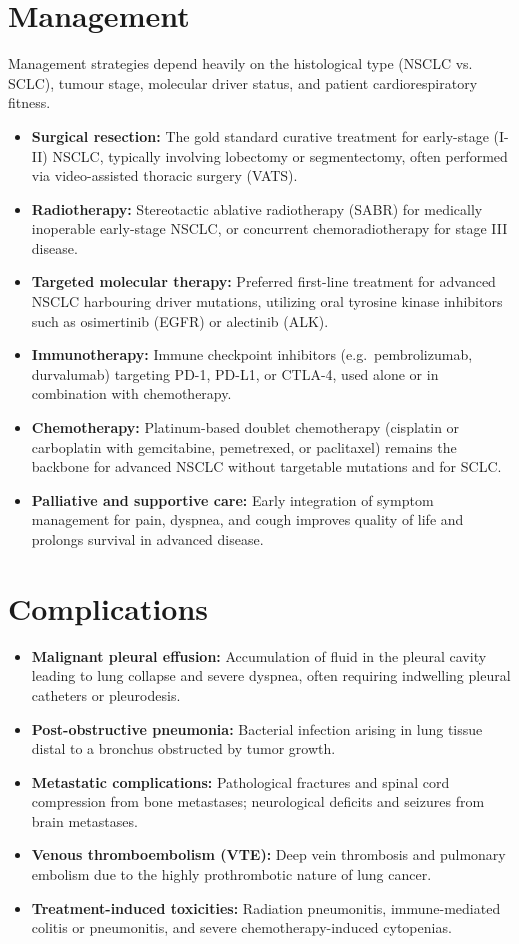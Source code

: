 \section*{Management}
Management strategies depend heavily on the histological type (NSCLC vs. SCLC), tumour stage, molecular driver status, and patient cardiorespiratory fitness.
\begin{itemize}
    \item \textbf{Surgical resection:} The gold standard curative treatment for early-stage (I-II) NSCLC, typically involving lobectomy or segmentectomy, often performed via video-assisted thoracic surgery (VATS).
    \item \textbf{Radiotherapy:} Stereotactic ablative radiotherapy (SABR) for medically inoperable early-stage NSCLC, or concurrent chemoradiotherapy for stage III disease.
    \item \textbf{Targeted molecular therapy:} Preferred first-line treatment for advanced NSCLC harbouring driver mutations, utilizing oral tyrosine kinase inhibitors such as osimertinib (EGFR) or alectinib (ALK).
    \item \textbf{Immunotherapy:} Immune checkpoint inhibitors (e.g.\ pembrolizumab, durvalumab) targeting PD-1, PD-L1, or CTLA-4, used alone or in combination with chemotherapy.
    \item \textbf{Chemotherapy:} Platinum-based doublet chemotherapy (cisplatin or carboplatin with gemcitabine, pemetrexed, or paclitaxel) remains the backbone for advanced NSCLC without targetable mutations and for SCLC.
    \item \textbf{Palliative and supportive care:} Early integration of symptom management for pain, dyspnea, and cough improves quality of life and prolongs survival in advanced disease.
\end{itemize}

\section*{Complications}
\begin{itemize}
    \item \textbf{Malignant pleural effusion:} Accumulation of fluid in the pleural cavity leading to lung collapse and severe dyspnea, often requiring indwelling pleural catheters or pleurodesis.
    \item \textbf{Post-obstructive pneumonia:} Bacterial infection arising in lung tissue distal to a bronchus obstructed by tumor growth.
    \item \textbf{Metastatic complications:} Pathological fractures and spinal cord compression from bone metastases; neurological deficits and seizures from brain metastases.
    \item \textbf{Venous thromboembolism (VTE):} Deep vein thrombosis and pulmonary embolism due to the highly prothrombotic nature of lung cancer.
    \item \textbf{Treatment-induced toxicities:} Radiation pneumonitis, immune-mediated colitis or pneumonitis, and severe chemotherapy-induced cytopenias.
\end{itemize}

